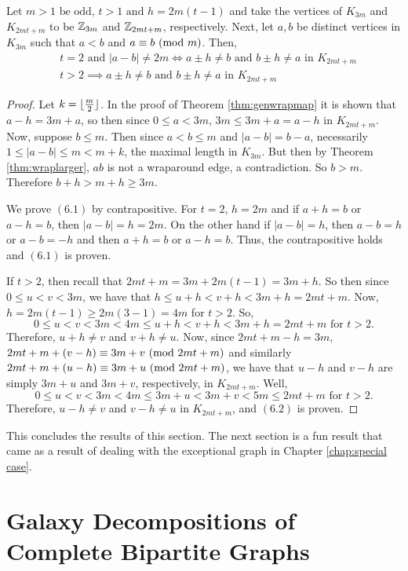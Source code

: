 \begin{corollary}\label{thm:gennewvertices}
    Let $m>1\text{ be odd},\,t>1\text{ and }h=2m(t-1)$ and take the vertices of $K_{3m}$ and $K_{2mt+m}$ to be $\mathbb{Z}_{3m}$ and $\mathbb{Z}_{2mt+m}$, respectively. Next, let $a,b$ be distinct vertices in $K_{3m}$ such that $a<b$ and $a\equiv b\ (\mathrm{mod}\ m)$. Then,
    \begin{align}
    &t=2\text{ and }|a-b|\neq 2m\iff a\pm h\neq b\text{ and }b\pm h \neq a\text{ in }K_{2mt+m}\\
    &t>2\implies a\pm h\neq b\text{ and }b\pm h \neq a\text{ in }K_{2mt+m}
    \end{align}
\end{corollary}
\begin{proof}
    Let $k=\lfloor\frac{m}{2}\rfloor$. In the proof of Theorem \ref{thm:genwrapmap} it is shown that $a-h=3m+a$, so then since $0\leq a<3m$, $3m\leq 3m+a=a-h$ in $K_{2mt+m}$. Now, suppose $b\leq m$. Then since $a<b\leq m$ and $|a-b|=b-a$, necessarily $1\leq |a-b|\leq m<m+k$, the maximal length in $K_{3m}$. But then by Theorem \ref{thm:wraplarger}, $ab$ is not a wraparound edge, a contradiction. So $b>m$. Therefore $b+h>m+h\geq 3m$.\newline

    \noindent We prove $(6.1)$ by contrapositive. For $t=2$, $h=2m$ and if $a+h = b$ or $a-h=b$, then $|a-b|=h=2m$. On the other hand if $|a-b|=h$, then $a-b=h$ or $a-b=-h$ and then $a+h = b$ or $a-h=b$. Thus, the contrapositive holds and $(6.1)$ is proven.\newline

    \noindent If $t>2$, then recall that $2mt+m=3m+2m(t-1)=3m+h$. So then since $0\leq u<v<3m$, we have that $h\leq u+h<v+h<3m+h=2mt+m$. Now, $h=2m(t-1)\geq 2m(3-1)=4m$ for $t>2$. So, $$0\leq u<v<3m<4m \leq u+h<v+h<3m+h=2mt+m\text{ for }t>2.$$ Therefore, $u+h\neq v$ and $v+ h\neq u$. Now, since $2mt+m-h=3m$, $2mt+m+(v-h)\equiv 3m+v\ (\mathrm{mod}\ 2mt+m)$ and similarly $2mt+m+(u-h)\equiv 3m+u\ (\mathrm{mod}\ 2mt+m)$, we have that $u-h$ and $v-h$ are simply $3m+u$ and $3m+v$, respectively, in $K_{2mt+m}$. Well, $$0\leq u<v<3m<4m\leq 3m+u<3m+v<5m\leq 2mt+m\text{ for }t>2.$$
    Therefore, $u-h\neq v$ and $v-h\neq u$ in $K_{2mt+m}$, and $(6.2)$ is proven.

\end{proof}
    This concludes the results of this section. The next section is a fun result that came as a result of dealing with the exceptional graph in Chapter \ref{chap:special case}.

\section{Galaxy Decompositions of Complete Bipartite Graphs}

